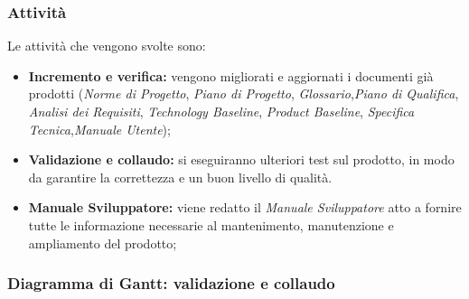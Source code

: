 \subsubsection{Attività}
Le attività che vengono svolte sono:
\begin{itemize}
	\item \textbf{Incremento e verifica:} vengono migliorati e aggiornati i documenti già prodotti (\textit{Norme di Progetto}, \textit{Piano di Progetto}, \textit{Glossario},\textit{Piano di Qualifica}, \textit{Analisi dei Requisiti}, \textit{Technology Baseline}, \textit{Product Baseline}, \textit{Specifica Tecnica},\textit{Manuale Utente});
	\item \textbf{Validazione e collaudo:} si eseguiranno ulteriori test sul prodotto, in modo da garantire la correttezza e un buon livello di qualità.
	\item \textbf{Manuale Sviluppatore:} viene redatto il \textit{Manuale Sviluppatore} atto a fornire tutte le informazione necessarie al mantenimento, manutenzione e ampliamento del prodotto;
\end{itemize}
\subsubsection{Diagramma di Gantt: validazione e collaudo}
